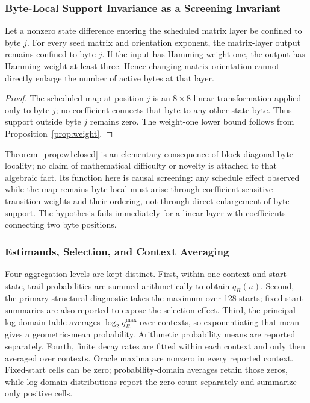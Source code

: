 \documentclass[cryptography,article,submit,oneauthor]{Definitions/mdpi}
\begin{document}
\subsubsection{Byte-Local Support Invariance as a Screening Invariant}\label{sec:3-7-1}
\begin{Theorem}\label{prop:w1closed}
Let a nonzero state difference entering the scheduled matrix layer be confined to byte $j$. For every seed matrix and orientation exponent, the matrix-layer output remains confined to byte $j$. If the input has Hamming weight one, the output has Hamming weight at least three. Hence changing matrix orientation cannot directly enlarge the number of active bytes at that layer.
\end{Theorem}
\begin{proof}
The scheduled map at position $j$ is an $8\times8$ linear transformation applied only to byte $j$; no coefficient connects that byte to any other state byte. Thus support outside byte $j$ remains zero. The weight-one lower bound follows from Proposition~\ref{prop:weight}.
\end{proof}
\begin{Remark}
Theorem~\ref{prop:w1closed} is an elementary consequence of block-diagonal byte locality; no claim of mathematical difficulty or novelty is attached to that algebraic fact. Its function here is causal screening: any schedule effect observed while the map remains byte-local must arise through coefficient-sensitive transition weights and their ordering, not through direct enlargement of byte support. The hypothesis fails immediately for a linear layer with coefficients connecting two byte positions.
\end{Remark}

\subsubsection{Estimands, Selection, and Context Averaging}\label{sec:estimands}
Four aggregation levels are kept distinct. First, within one context and start state, trail probabilities are summed arithmetically to obtain $q_R(u)$. Second, the primary structural diagnostic takes the maximum over 128 starts; fixed-start summaries are also reported to expose the selection effect. Third, the principal log-domain table averages $\log_2 q_R^{\max}$ over contexts, so exponentiating that mean gives a geometric-mean probability. Arithmetic probability means are reported separately. Fourth, finite decay rates are fitted within each context and only then averaged over contexts. Oracle maxima are nonzero in every reported context. Fixed-start cells can be zero; probability-domain averages retain those zeros, while log-domain distributions report the zero count separately and summarize only positive cells.
\end{document}
